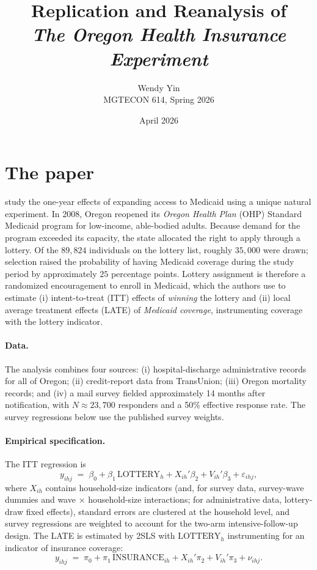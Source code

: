 \documentclass[11pt]{article}
\title{Replication and Reanalysis of \\
  \emph{The Oregon Health Insurance Experiment}
  \citep{Finkelstein2012}}
\author{Wendy Yin \\ MGTECON 614, Spring 2026}
\date{April 2026}
\begin{document}
\maketitle

\section{The paper}

\citet{Finkelstein2012} study the one-year effects of expanding access
to Medicaid using a unique natural experiment. In 2008, Oregon reopened
its \emph{Oregon Health Plan} (OHP) Standard Medicaid program for
low-income, able-bodied adults. Because demand for the program exceeded
its capacity, the state allocated the right to apply through a lottery.
Of the $89{,}824$ individuals on the lottery list, roughly $35{,}000$
were drawn; selection raised the probability of having Medicaid coverage
during the study period by approximately $25$ percentage points.
Lottery assignment is therefore a randomized encouragement to enroll in Medicaid,
which the authors use to estimate (i) intent-to-treat (ITT) effects of
\emph{winning} the lottery and (ii) local average treatment effects
(LATE) of \emph{Medicaid coverage}, instrumenting coverage with the
lottery indicator.

\paragraph{Data.} The analysis combines four sources:
(i) hospital-discharge administrative records for all of Oregon;
(ii) credit-report data from TransUnion;
(iii) Oregon mortality records; and
(iv) a mail survey fielded approximately 14 months after notification,
with $N\!\approx\!23{,}700$ responders and a 50\% effective response
rate. The survey regressions below use the published survey weights.

\paragraph{Empirical specification.} The ITT regression is
\begin{equation}\label{eq:itt}
y_{ihj} \;=\; \beta_{0} + \beta_{1}\,\text{LOTTERY}_{h}
              + X_{ih}'\beta_{2} + V_{ih}'\beta_{3} + \varepsilon_{ihj},
\end{equation}
where $X_{ih}$ contains household-size indicators (and, for survey data,
survey-wave dummies and wave $\times$ household-size interactions; for
administrative data, lottery-draw fixed effects), standard errors are
clustered at the household level, and survey regressions are weighted
to account for the two-arm intensive-follow-up design. The LATE is
estimated by 2SLS with $\text{LOTTERY}_{h}$ instrumenting for an
indicator of insurance coverage:
\begin{equation}\label{eq:iv}
y_{ihj} \;=\; \pi_{0} + \pi_{1}\,\text{INSURANCE}_{ih}
              + X_{ih}'\pi_{2} + V_{ih}'\pi_{3} + \nu_{ihj}.
\end{equation}
\end{document}

